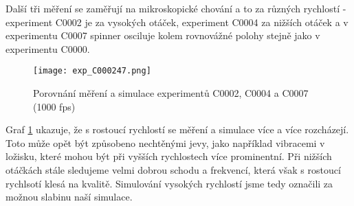 Další tři měření se zaměřují na mikroskopické chování a to za různých rychlostí - experiment C0002 je za vysokých otáček, experiment C0004 za nižších otáček a v experimentu C0007 spinner osciluje kolem rovnovážné polohy stejně jako v experimentu C0000.

\begin{figure}[!ht]
    \texttt{[image: exp\_C000247.png]}
    \centering
    \caption{Porovnání měření a simulace experimentů C0002, C0004 a C0007 (1000 fps)}
    \label{fig:exp_C000247}
\end{figure}

Graf \ref{fig:exp_C000247} ukazuje, že s rostoucí rychlostí se měření a simulace více a více rozcházejí. Toto může opět být způsobeno nechtěnými jevy, jako například vibracemi v ložisku, které mohou být při vyšších rychlostech více prominentní. Při nižších otáčkách stále sledujeme velmi dobrou schodu a frekvencí, která však s rostoucí rychlsotí klesá na kvalitě. Simulování vysokých rychlostí jsme tedy označili za možnou slabinu naší simulace.